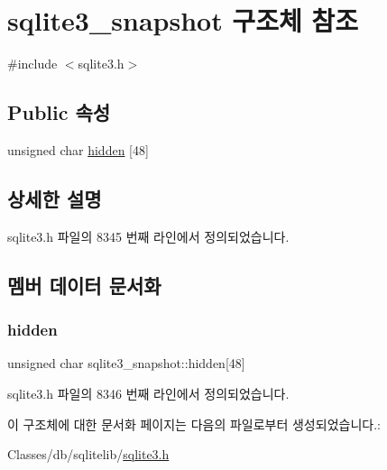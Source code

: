 \hypertarget{structsqlite3__snapshot}{}\section{sqlite3\+\_\+snapshot 구조체 참조}
\label{structsqlite3__snapshot}


{\ttfamily \#include $<$sqlite3.\+h$>$}

\subsection*{Public 속성}
\begin{DoxyCompactItemize}
\item 
unsigned char \hyperlink{structsqlite3__snapshot_aeed328b50a9580e9a91d0bf10612be4e}{hidden} \mbox{[}48\mbox{]}
\end{DoxyCompactItemize}


\subsection{상세한 설명}


sqlite3.\+h 파일의 8345 번째 라인에서 정의되었습니다.



\subsection{멤버 데이터 문서화}
\mbox{\label{structsqlite3__snapshot_aeed328b50a9580e9a91d0bf10612be4e}} 
\subsubsection{\texorpdfstring{hidden}{hidden}}
{\footnotesize\ttfamily unsigned char sqlite3\+\_\+snapshot\+::hidden\mbox{[}48\mbox{]}}



sqlite3.\+h 파일의 8346 번째 라인에서 정의되었습니다.



이 구조체에 대한 문서화 페이지는 다음의 파일로부터 생성되었습니다.\+:\begin{DoxyCompactItemize}
\item 
Classes/db/sqlitelib/\hyperlink{sqlite3_8h}{sqlite3.\+h}\end{DoxyCompactItemize}
